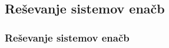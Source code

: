 
    
    
    \subsection{Reševanje sistemov enačb}

        \begin{frame}
            \frametitle{Reševanje sistemov enačb}
        \end{frame}



